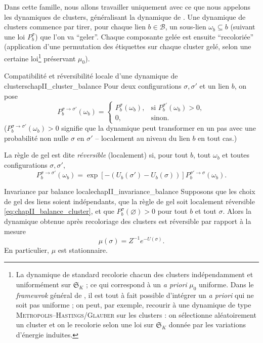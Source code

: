 Dans cette famille, nous allons travailler uniquement avec ce que nous appelons les dynamiques de clusters, généralisant la dynamique de \SW{} \cite{SwendsenWang}. Une dynamique de clusters commence par tirer, pour chaque lien $b \in \mathcal B$, un sous-lien $\omega_b \subseteq b$ (suivant une loi $P_b^\sigma$) que l'on va ``geler''.
Chaque composante gelée est ensuite ``recoloriée'' (application d'une permutation des étiquettes sur chaque cluster gelé, selon une certaine loi\footnote{La dynamique de \SW{} standard recolorie chacun des clusters indépendamment et uniformément sur $\mathfrak S_K$ ; ce qui correspond à un \emph{a priori} $\mu_0$ uniforme. Dans le \emph{framewrok} général de \ES{} \cite{EdwardsSokal}, il est tout à fait possible d'intégrer un \emph{a priori} qui ne soit pas uniforme ; on peut, par exemple, recourir à une dynamique de type \textsc{Metropolis--Hastings/Glauber} \cite{GlauberMetropolisDiaconis2009} sur les clusters : on sélectionne aléatoirement un cluster et on le recolorie selon une loi sur $\mathfrak S_K$ donnée par les variations d'énergie induites.} préservant $\mu_0$).

\begin{Definition}{Compatibilité et réversibilité locale d'une dynamique de clusters}{chapII_cluster_balance}
Pour deux configurations $\sigma,\sigma'$ et un lien $b$, on pose
\begin{equation}
    P_b^{\sigma\to\sigma'}(\omega_b)
    =
    \begin{cases}
        P_b^\sigma(\omega_b),&\text{si }P_b^{\sigma'}(\omega_b)>0,\\
        0,&\text{sinon.}
    \end{cases}
    \label{eq:chapII_compatibilite}
\end{equation}
($P_b^{\sigma\to\sigma'}(\omega_b) > 0$ signifie que la dynamique peut transformer en un pas avec une probabilité non nulle $\sigma$ en $\sigma'$ -- localement au niveau du lien $b$ en tout cas.)

La règle de gel est dite \emph{réversible} (localement) si, pour tout $b$, tout $\omega_b$ et toutes configurations $\sigma,\sigma'$,
\begin{equation}
    P_b^{\sigma\to\sigma'}(\omega_b)
    =
    \exp\left[-\left(U_b(\sigma')-U_b(\sigma)\right)\right]
    P_b^{\sigma'\to\sigma}(\omega_b).
    \label{eq:chapII_balance_cluster}
\end{equation}
\end{Definition}

\begin{Theoreme}{Invariance par balance locale}{chapII_invariance_balance}
Supposons que les choix de gel des liens soient indépendants, que la règle de gel soit localement réversible \eqref{eq:chapII_balance_cluster}, et que $P_b^\sigma(\varnothing)>0$ pour tout $b$ et tout $\sigma$. Alors la dynamique obtenue après recoloriage des clusters est réversible par rapport à la mesure
\[
    \mu(\sigma)=Z^{-1}e^{-U(\sigma)}.
\]
En particulier, $\mu$ est stationnaire.
\end{Theoreme}

